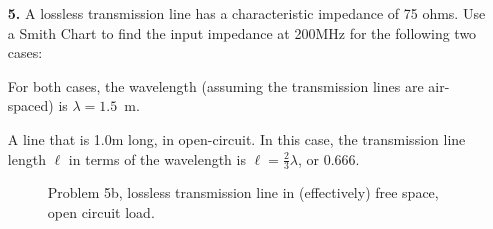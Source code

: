 \documentclass{report}						%
\begin{document}
\begin{spacing}{1.1}
\begin{enumerate}
 Do this again, but this time swap for the interval over $0 \leq r<  \infty$ and $\mathrm{x}$ values 0, $\pm$0.25, $\pm$0.5, $\pm$1.0, $\pm$2.0, $\pm$4.0.

\begin{figure}[!hbp]
\centering
{}
\caption{$X \in [0 \enspace\pm0.25 \enspace\pm0.5 \enspace\pm1 \enspace\pm2\enspace \pm4]\enspace \&\enspace r\in [0,10000)$}
\end{figure}

\item[{\bf \large 5.}]
A lossless transmission line has a characteristic impedance of 75 ohms. Use a Smith Chart to find the input impedance at 200MHz for the following two cases:

For both cases, the wavelength (assuming the transmission lines are air-spaced) is $\lambda=1.5\enspace \text{m}.$

 A line that is 1.0m long, in open-circuit. In this case, the transmission line length $\ell$ in terms of the wavelength is $\ell=\frac{2}{3}\lambda$, or 0.666. 
\begin{figure}[!hbp]
\centering
{}
\caption{Problem 5b, lossless transmission line in (effectively) free space, open circuit load.}
\end{figure}


\end{enumerate}
\end{spacing}
\end{document}
